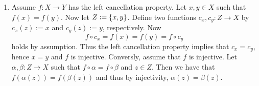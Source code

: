 \begin{enumerate}[label = \textbf{Exercise \arabic*.},wide = 0pt, itemsep=1.5ex]
		\noindent 
	\item Assume $f : X \to Y$ has the left cancellation property. Let $x,y \in X$ such that $f(x) = f(y)$. Now let $Z := \cbr[0]{x,y}$. Define two functions $c_x,c_y : Z \to X$ by $c_x(z) := x$ and $c_y(z) := y$, respectively. Now
		\begin{equation*}
			f \circ c_x = f(x) = f(y) = f \circ c_y
		\end{equation*}
		\noindent holds by assumption. Thus the left cancellation property implies that $c_x = c_y$, hence $x = y$ and $f$ is injective. Conversly, assume that $f$ is injective. Let $\alpha,\beta : Z \to X$ such that $f \circ \alpha = f \circ \beta$ and $z \in Z$. Then we have that $f(\alpha(z)) = f(\beta(z))$ and thus by injectivity, $\alpha(z) = \beta(z)$. 
\end{enumerate}
\printbibliography


